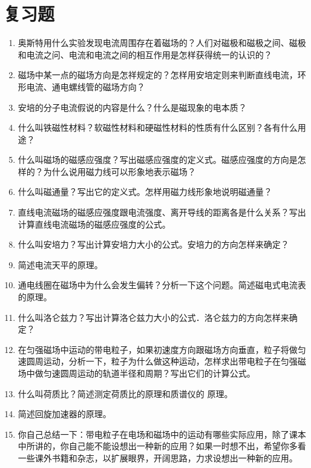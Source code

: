 \section*{复习题}
\begin{enumerate}
    \item 奥斯特用什么实验发现电流周围存在着磁场的？人们对磁极和磁极之间、磁极和电流之问、电流和电流之间的相互作用是怎样获得统一的认识的？
    \item 磁场中某一点的磁场方向是怎祥规定的？怎样用安培定则来判断直线电流，环形电流、通电螺线管的磁场方向？
    \item 安培的分子电流假说的内容是什么？什么是磁现象的电本质？
    \item 什么叫铁磁性材料？软磁性材料和硬磁性材料的性质有什么区别？各有什么用途？
    \item 什么叫磁场的磁感应强度？写出磁感应强度的定义式。磁感应强度的方向是怎样的？为什么说用磁力线可以形象地表示磁场？
    \item 什么叫磁通量？写出它的定义式。怎样用磁力线形象地说明磁通量？
    
    \item 直线电流磁场的磁感应强度跟电流强度、离开导线的距离各是什么关系？写出计算直线电流磁场的磁感应强度的公式。
    \item 什么叫安培力？写出计算安培力大小的公式。安培力的方向怎样来确定？
    \item 简述电流天平的原理。\item 通电线圈在磁场中为什么会发生偏转？分析一下这个问题。简述磁电式电流表的原理。
    \item 什么叫洛仑兹力？写出计算洛仑兹力大小的公式．洛仑兹力的方向怎样来确定？
    \item 在匀强磁场中运动的带电粒子，如果初速度方向跟磁场方向垂直，粒子将做匀速圆周运动，分析一下，粒子为什么做这种运动，怎样求出带电粒子在匀强磁场中做匀速圆周运动的轨道半径和周期？写出它们的计算公式。
    \item 什么叫荷质比？简述测定荷质比的原理和质谱仪的
    原理。
    \item 简述回旋加速器的原理。\item 你自己总结一下：带电粒子在电场和磁场中的运动有哪些实际应用，除了课本中所讲的，你自己能不能设想出一种新的应用？如果一时想不出，希望你多看一些课外书籍和杂志，以扩展眼界，开阔思路，力求设想出一种新的应用。
\end{enumerate}

